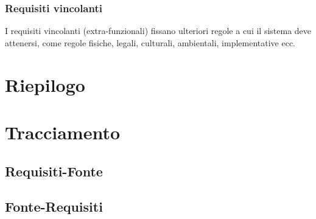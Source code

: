 \documentclass[a4paper, titlepage]{article}
\begin{document}


\subsubsection{Requisiti vincolanti}
I requisiti vincolanti (extra-funzionali) fissano ulteriori regole a cui il sistema deve attenersi, come regole fisiche, legali, culturali, ambientali, implementative ecc.



\newpage
\section{Riepilogo}



\section{Tracciamento}
\subsection{Requisiti-Fonte}



\subsection{Fonte-Requisiti}


\end{document}
